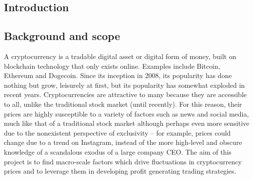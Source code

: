 \documentclass[twoside]{report}
\date{June 2021}
\begin{document}
\begin{spacing}{1}

\selectfont
\tableofcontents



\chapter{Introduction}

\section{Background and scope}
A cryptocurrency is a tradable digital asset or digital form of money, built on blockchain technology that only exists online. Examples include Bitcoin, Ethereum and Dogecoin. Since its inception in 2008, its popularity has done nothing but grow, leisurely at first, but its popularity has somewhat exploded in recent years. Cryptocurrencies are attractive to many because they are accessible to all, unlike the traditional stock market (until recently). For this reason, their prices are highly susceptible to a variety of factors such as news and social media, much like that of a traditional stock market although perhaps even more sensitive due to the nonexistent perspective of exclusivity -- for example, prices could change due to a trend on Instagram, instead of the more high-level and obscure knowledge of a scandalous exodus of a large company CEO. The aim of this project is to find macro-scale factors which drive fluctuations in cryptocurrency prices and to leverage them in developing profit generating trading strategies. 


\end{spacing}
\end{document}
